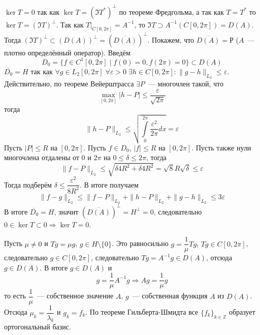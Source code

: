 \documentclass[14pt]{extarticle}
\begin{document}
\begin{Prim}
    $\ker T = 0$ так как $\ker T = (\Im T^*)^\perp$ по теореме Фредгольма, а так как 
    $T = T^*$ то $\ker T =(\Im T)^\perp$.
    Так как $T|_{C[0,2\pi]} = A^{-1}$, то $\Im T \supset A^{-1}(C[0,2\pi]) = D(A)$.
    Тогда $(\Im T)^\perp \subset (D(A))^\perp = \left(\overline{D(A)}\right)^\perp$.
    Покажем, что $\overline{D(A)} = Р$ ($A$~--- плотно определённый оператор).
    Введём
    $$
    D_0 = \{f \in C^1[0, 2\pi] \mid f(0) = 0, f(2\pi) = 0\} \subset D(A)
    $$
    $\overline{D_0} = H$ так как $\forall g \in L_2[0,2\pi]\; \forall \varepsilon > 0\;
    \exists h \in C[0, 2\pi]\colon \|g - h\|_{L_2} \le \varepsilon$.
    Действительно, по теореме Вейерштрасса $\exists P$~--- многочлен такой, что
    $$
    \max \limits_{[0, 2\pi]} |h - P| \le \dfrac{\varepsilon}{\sqrt{2\pi}}
    $$
    тогда
    $$
    \|h - P\|_{L_2} \le \sqrt{\int\limits_0^{2 \pi}\dfrac{\varepsilon^2}{2\pi}dx} = \varepsilon
    $$
    Пусть $|P| \le R$ на $[0, 2\pi]$.
    Пусть $f \in D_0$, $|f| \le R$ на $[0, 2\pi]$.
    Пусть также нули многочлена отдалены от 0 и $2\pi$ на $0 \le \delta \le 2\pi$, тогда
    $$
    \|f - P\|_{L_2} \le \sqrt{\delta 4 R^2 + \delta 4 R^2} = \sqrt{8}R\sqrt{\delta} \le \varepsilon
    $$
    Тогда подберём $\delta \le \dfrac{\varepsilon^2}{8R^2}$.
    В итоге получаем
    $$
    \|f - g\|_{L_2} \le \|f - P\|_{L_2} + \|h - P\|_{L_2} + \|g - h\|_{L_2} \le 3 \varepsilon
    $$
    В итоге $\overline{D_0} = H$, значит $\left(\overline{D(A)}\right)^\perp = H^\perp = 0$,
    следовательно $0 \in \ker T \subset 0 \Rightarrow \ker T = 0$.
    
    Пусть $\mu \neq 0$ и $Tg = \mu g$, $g \in H \setminus\{0\}$.
    Это равносильно
    $g = \dfrac{1}{\mu}Tg$, $Tg \in C[0, 2\pi]$, следовательно $g \in C[0,2\pi]$, следовательно
    $Tg = A^{-1} g \in D(A)$, отсюда $g \in D(A)$.
    В итоге $g \in D(A)$ и
    $$
    g = \dfrac{1}{\mu}A^{-1}g \Rightarrow Ag = \dfrac{1}{\mu}g
    $$
    то есть $\dfrac{1}{\mu}$~--- собственное значение $A$, $g$~--- собственная функция $A$
    из $D(A)$.
    Отсюда $\mu_k = \dfrac{1}{\lambda_k}$ и $g_k = f_k$.
    По теореме Гильберта-Шмидта все $\{f_k\}_{k \in \mathbb Z}$ образует ортогональный
    базис.
\end{Prim}
\end{document}

